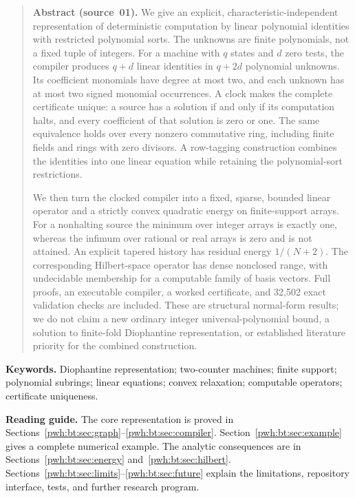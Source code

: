 \documentclass[11pt,letterpaper]{article}
\numberwithin{equation}{section}
\theoremstyle{definition}
\begin{document}
\begin{quote}\small
\textbf{Abstract (source~01).}
We give an explicit, characteristic-independent representation of deterministic
computation by linear polynomial identities with restricted polynomial sorts.
The unknowns are finite polynomials, not a fixed tuple of integers. For a
machine with $q$ states and $d$ zero tests, the compiler produces $q+d$ linear
identities in $q+2d$ polynomial unknowns. Its coefficient monomials have degree
at most two, and each unknown has at most two signed monomial occurrences.
A clock makes the complete certificate unique: a source has a solution if
and only if its computation halts, and every coefficient of that solution
is zero or one. The same equivalence holds over every nonzero commutative
ring, including finite fields and rings with zero divisors. A row-tagging
construction combines the identities into one linear equation while
retaining the polynomial-sort restrictions.

We then turn the clocked compiler into a fixed, sparse, bounded linear
operator and a strictly convex quadratic energy on finite-support arrays.
For a nonhalting source the minimum over integer arrays is exactly one,
whereas the infimum over rational or real arrays is zero and is not
attained. An explicit tapered history has residual energy $1/(N+2)$.
The corresponding Hilbert-space operator has dense nonclosed range, with
undecidable membership for a computable family of basis vectors. Full
proofs, an executable compiler, a worked certificate, and 32,502 exact
validation checks are included. These are structural normal-form results;
we do not claim a new ordinary integer universal-polynomial bound, a
solution to finite-fold Diophantine representation, or established
literature priority for the combined construction.
\end{quote}

\noindent\textbf{Keywords.} Diophantine representation; two-counter machines;
finite support; polynomial subrings; linear equations; convex relaxation;
computable operators; certificate uniqueness.

\noindent\textbf{Reading guide.}
The core representation is proved in Sections~\ref{pwh:bt:sec:graph}--\ref{pwh:bt:sec:compiler}.
Section~\ref{pwh:bt:sec:example} gives a complete numerical example.
The analytic consequences are in Sections~\ref{pwh:bt:sec:energy} and~\ref{pwh:bt:sec:hilbert}.
Sections~\ref{pwh:bt:sec:limits}--\ref{pwh:bt:sec:future} explain the limitations,
repository interface, tests, and further research program.
\end{document}
